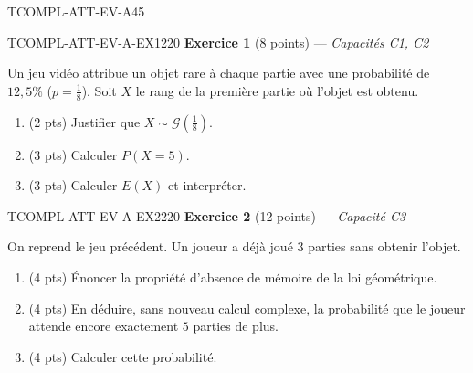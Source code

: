 

\begin{evaluation}{TCOMPL-ATT-EV-A}{45}

\begin{exercice}{TCOMPL-ATT-EV-A-EX1}{2}{20}
\textbf{Exercice 1} (8 points) --- \textit{Capacités C1, C2}

\medskip

Un jeu vidéo attribue un objet rare à chaque partie avec une probabilité de $12{,}5\%$ ($p=\frac{1}{8}$). Soit $X$ le rang de la première partie où l'objet est obtenu.
\begin{enumerate}
  \item (2 pts) Justifier que $X\sim\mathcal{G}\!\left(\frac{1}{8}\right)$.
  \item (3 pts) Calculer $P(X=5)$.
  \item (3 pts) Calculer $E(X)$ et interpréter.
\end{enumerate}
\end{exercice}

\begin{exercice}{TCOMPL-ATT-EV-A-EX2}{2}{20}
\textbf{Exercice 2} (12 points) --- \textit{Capacité C3}

\medskip

On reprend le jeu précédent. Un joueur a déjà joué $3$ parties sans obtenir l'objet.
\begin{enumerate}
  \item (4 pts) Énoncer la propriété d'absence de mémoire de la loi géométrique.
  \item (4 pts) En déduire, sans nouveau calcul complexe, la probabilité que le joueur attende encore exactement $5$ parties de plus.
  \item (4 pts) Calculer cette probabilité.
\end{enumerate}
\end{exercice}

\end{evaluation}
